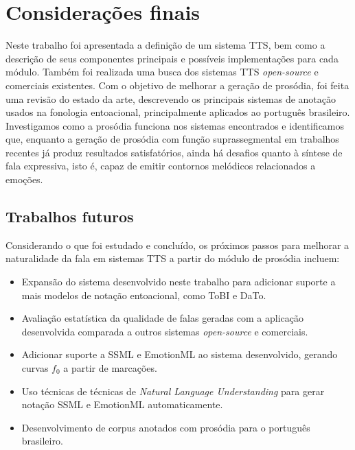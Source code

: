 
\chapter{Considerações finais}
Neste trabalho foi apresentada a definição de um sistema TTS, bem como a descrição
de seus componentes principais e possíveis implementações para cada módulo.
Também foi realizada uma busca dos sistemas TTS \emph{open-source} e comerciais
existentes. Com o objetivo de melhorar a geração de prosódia, foi feita uma
revisão do estado da arte, descrevendo os principais sistemas de anotação usados na
fonologia entoacional, principalmente aplicados ao português brasileiro.
Investigamos como a prosódia funciona nos sistemas encontrados e identificamos
que, enquanto a geração de prosódia com função suprassegmental em trabalhos
recentes já produz resultados satisfatórios, ainda há desafios quanto à síntese
de fala expressiva, isto é, capaz de emitir contornos melódicos relacionados a
emoções.

\section{Trabalhos futuros}
Considerando o que foi estudado e concluído, os próximos passos para melhorar a
naturalidade da fala em sistemas TTS a partir do módulo de prosódia incluem:

\begin{itemize}
\item Expansão do sistema desenvolvido neste trabalho para adicionar suporte a
  mais modelos de notação entoacional, como ToBI e DaTo.
\item Avaliação estatística da qualidade de falas geradas com a aplicação desenvolvida comparada a outros sistemas \emph{open-source} e comerciais.
\item Adicionar suporte a SSML e EmotionML ao sistema desenvolvido, gerando
  curvas $ f_0 $ a partir de marcações.
\item Uso técnicas de técnicas de \emph{Natural Language Understanding} para
  gerar notação SSML e EmotionML automaticamente.
\item Desenvolvimento de corpus anotados com prosódia para o português brasileiro.
\end{itemize}

